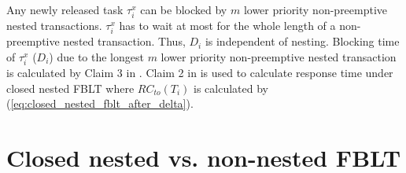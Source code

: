 \documentclass[preprint]{sigplanconf}
\begin{document}
%
Any newly released task $\tau_{i}^{x}$ can be blocked by $m$ lower
priority non-preemptive nested transactions. $\tau_{i}^{x}$ has to
wait at most for the whole length of a non-preemptive nested transaction.
Thus, $D_{i}$ is independent of nesting. Blocking time of $\tau_{i}^{x}$
($D_{i}$) due to the longest $m$ lower priority non-preemptive nested
transaction is calculated by Claim 3 in \cite{fblt}. Claim 2 in \cite{fblt}
is used to calculate response time under closed nested FBLT where
$RC_{to}(T_{i})$ is calculated by (\ref{eq:closed_nested_fblt_after_delta}).


\section{Closed nested vs. non-nested FBLT}\label{sec:schedulabiltiy comparison}
\end{document}
